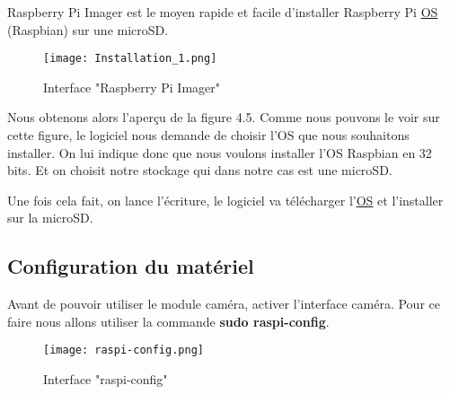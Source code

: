             Raspberry Pi Imager est le moyen rapide et facile d’installer Raspberry Pi \underline{OS} (Raspbian) sur une microSD. 


            \begin{figure}[ht]
                \centering
                \texttt{[image: Installation\_1.png]} 
                \caption{Interface "Raspberry Pi Imager"}
            \end{figure}

            Nous obtenons alors l'aperçu de la figure 4.5.
            Comme nous pouvons le voir sur cette figure, le logiciel nous demande de choisir l'OS que nous souhaitons installer.
            On lui indique donc que nous voulons installer l'OS Raspbian en 32 bits. Et on choisit notre stockage qui dans notre cas est une microSD.

            \vspace{0.2cm}

            Une fois cela fait, on lance l'écriture, le logiciel va télécharger l'\underline{OS} et l'installer sur la microSD.

    
            \subsection{Configuration du matériel}
            Avant de pouvoir utiliser le module caméra, activer l'interface caméra.
            Pour ce faire nous allons utiliser la commande \textbf{sudo raspi-config}.

            \begin{figure}[ht]
                \centering
                \texttt{[image: raspi-config.png]} 
                \caption{Interface "raspi-config"}
            \end{figure}

